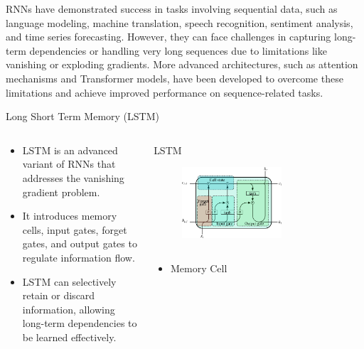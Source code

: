 \documentclass[10pt,aspectratio=169,dvipsnames]{beamer} %
\begin{document}
{		RNNs have demonstrated success in tasks involving sequential data, such as language modeling, machine translation, speech recognition, sentiment analysis, and time series forecasting. However, they can face challenges in capturing long-term dependencies or handling very long sequences due to limitations like vanishing or exploding gradients. More advanced architectures, such as attention mechanisms and Transformer models, have been developed to overcome these limitations and achieve improved performance on sequence-related tasks.
	}
	\setcounter{subfigure}{0}
	\begin{frame}{Long Short Term Memory (LSTM)}
		\begin{columns}[T]
			\begin{column}[c]{0.45\textwidth}
				\justifying
				\begin{itemize}
					\item LSTM is an advanced variant of RNNs that addresses the vanishing gradient problem.
					\item It introduces memory cells, input gates, forget gates, and output gates to regulate information flow.
					\item LSTM can selectively retain or discard information, allowing long-term dependencies to be learned effectively.
				\end{itemize}
			\end{column}
			\begin{column}[c]{0.55\textwidth}
				\begin{block}{LSTM}
					\begin{figure}
						\includegraphics[width=0.65\textwidth]{lstm.png}
					\end{figure}
				\begin{columns}
					\begin{column}[c]{0.45\textwidth}
						\begin{itemize}
							\item \alert{Memory Cell}

\end{itemize}
\end{column}
\end{columns}
\end{block}
\end{column}
\end{columns}
\end{frame}
\end{document}
